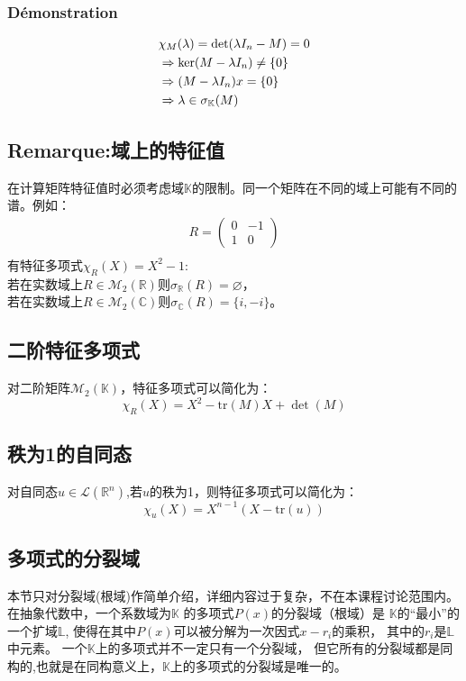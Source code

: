 \documentclass[12pt, a4paper, oneside]{ctexbook}
\begin{document}
  \subsubsection{Démonstration}
  \begin{equation}
    \notag
    \begin{aligned}
    & \chi _M(\lambda)=\det(\lambda I_n-M)=0\\
    & \Rightarrow \ker(M-\lambda I_n)\neq\{0\}\\
    & \Rightarrow (M-\lambda I_n)x=\{0\}\\
    & \Rightarrow \lambda\in\sigma_{\mathbb{K}}(M)\\
    \end{aligned}
  \end{equation}
  \subsection{Remarque:域上的特征值}
  在计算矩阵特征值时必须考虑域$\mathbb{K}$的限制。同一个矩阵在不同的域上可能有不同的谱。例如：
  $$
  \begin{aligned}
    R=\begin{pmatrix} 0 & -1 \\ 1 & 0 \end{pmatrix}\\
  \end{aligned}
  $$
  有特征多项式$\chi _R(X)=X^2-1$:\\
  若在实数域上$R\in \mathcal{M}_2(\mathbb{R})$则$\sigma_{\mathbb{R}}(R)=\varnothing$，\\
  若在实数域上$R\in \mathcal{M}_2(\mathbb{C})$则$\sigma_{\mathbb{C}}(R)=\{i,-i\}$。
  \subsection{二阶特征多项式}
  对二阶矩阵$\mathcal{M}_2(\mathbb{K})$，特征多项式可以简化为：
  $$
  \chi _R(X)=X^2-\mbox{tr}(M)X+\det(M)
  $$
  \subsection{秩为1的自同态}
  对自同态$u\in\mathcal{L} (\mathbb{R}^n)$,若$u$的秩为1，则特征多项式可以简化为：
  $$
  \chi _u(X)=X^{n-1}(X-\mbox{tr}(u))
  $$
  \subsection{多项式的分裂域}
  本节只对分裂域(根域)作简单介绍，详细内容过于复杂，不在本课程讨论范围内。
  在抽象代数中，一个系数域为$\mathbb {K}$ 的多项式${P(x)}$的分裂域（根域）是
  $\mathbb {K} $的“最小”的一个扩域$\mathbb{L}$,
  使得在其中$P(x)$可以被分解为一次因式$x-r_{i}$的乘积，
  其中的$r_{i}$是$\mathbb{L}$中元素。
  一个$\mathbb {K} $上的多项式并不一定只有一个分裂域，
  但它所有的分裂域都是同构的,也就是在同构意义上，$\mathbb {K} $上的多项式的分裂域是唯一的。
\end{document}
